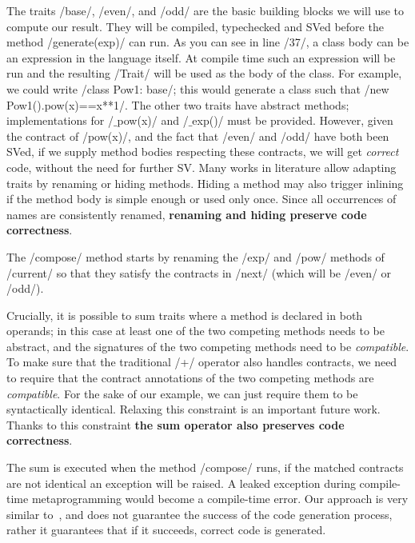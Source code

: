 The traits /base/, /even/, and /odd/ are the basic building blocks we will use to compute our result. They will be compiled, typechecked and SVed before the method /generate(exp)/ can run.
As you can see in line /37/, a class body can be an expression in the language itself.
At compile time such an expression will be run and the resulting /Trait/ will be used as the body of the class.
For example, we could write /class Pow1: base/; this would generate a class such that /new Pow1().pow(x)==x**1/.
The other two traits have abstract methods; implementations for /$\_$pow(x)/ and /$\_$exp()/ must be provided. However, given the contract of /pow(x)/,
and the fact that /even/ and /odd/ have both been SVed,
if we supply method bodies respecting these contracts, we will get \emph{correct} code, without the need for further SV.
Many works in literature allow adapting traits by renaming or hiding methods\cite{servetto2014meta,reppy2007metaprogramming,liquori2008feathertrait}. Hiding a method may also trigger inlining if the method body is simple enough or used only once.
Since all occurrences of names are consistently renamed, \textbf{renaming and hiding preserve code correctness}.

The /compose/ method starts by renaming the /exp/ and /pow/ methods of /current/
so that they satisfy the contracts in /next/ (which will be 
/even/ or /odd/).

Crucially, it is possible to sum traits where a method is declared in both operands; in this case at least one of the two competing methods needs to be abstract, and the signatures of the two competing methods need to be \emph{compatible}.
To make sure that the traditional /+/ operator also handles contracts, we need to require that the contract annotations of the two competing methods  are \emph{compatible}.
For the sake of our example, we can just require them to be syntactically identical. Relaxing this constraint is an important future work.
Thanks to this constraint \textbf{the sum operator also preserves code correctness}.

The sum is executed when the method /compose/ runs, if the matched contracts are not identical an exception will be raised. A leaked exception during compile-time metaprogramming would become a compile-time error. 
Our approach is very similar to~\cite{servetto2014meta}, and does not guarantee the success of the code generation process, rather it guarantees that if it succeeds, correct code is generated.

